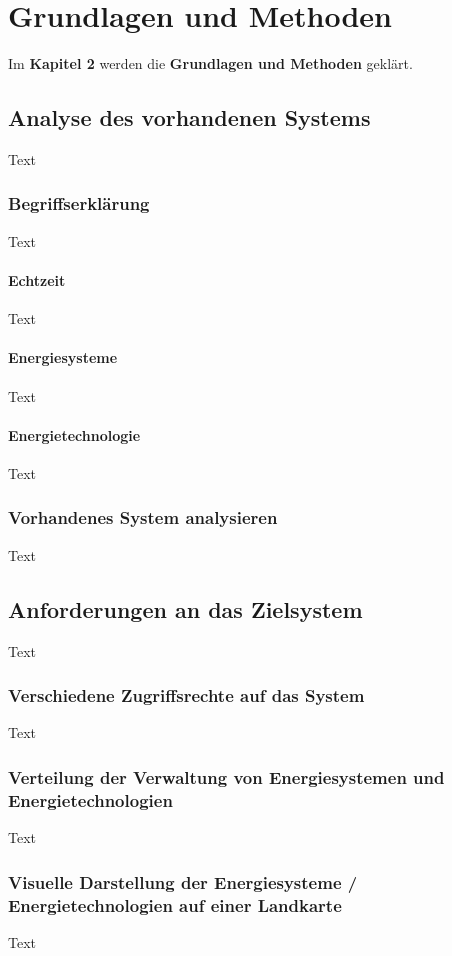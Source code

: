 \chapter{Grundlagen und Methoden}
Im \textbf{Kapitel 2} werden die \textbf{Grundlagen und Methoden} geklärt.


\section{Analyse des vorhandenen Systems}
Text

\subsection{Begriffserklärung}
Text

\subsubsection{Echtzeit}
Text

\subsubsection{Energiesysteme}
Text

\subsubsection{Energietechnologie}
Text

\subsection{Vorhandenes System analysieren}
Text



\section{Anforderungen an das Zielsystem}
Text

\subsection{Verschiedene Zugriffsrechte auf das System}
Text

\subsection{Verteilung der Verwaltung von Energiesystemen und Energietechnologien}
Text

\subsection{Visuelle Darstellung der Energiesysteme / Energietechnologien auf einer Landkarte}
Text

